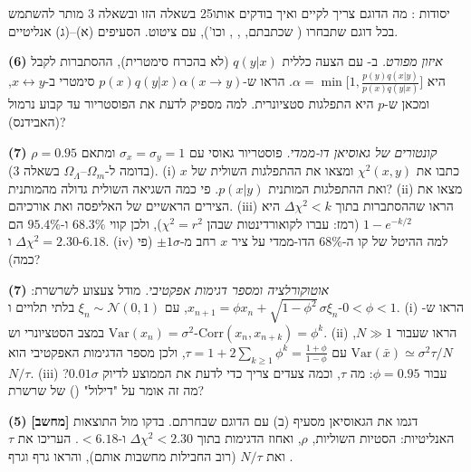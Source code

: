 \documentclass[11pt,a4paper]{article}
\begin{document}
\begin{question}{יסודות : מה הדוגם צריך לקיים ואיך בודקים אותו}{25}
בשאלה הזו ובשאלה 3 מותר להשתמש בכל דוגם שתבחרו ( שכתבתם, , ,  וכו'), עם ציטוט. הסעיפים (א)--(ג) אנליטיים.
\begin{parts}
\item \textbf{(6)} \emph{איזון מפורט.} ב- עם הצעה כללית $q(y|x)$ (לא בהכרח סימטרית), ההסתברות לקבל היא $\alpha=\min\!\big[1,\frac{p(y)q(x|y)}{p(x)q(y|x)}\big]$. הראו ש-$p(x)q(y|x)\alpha(x\to y)$ סימטרי ב-$x\leftrightarrow y$, ומכאן ש-$p$ היא התפלגות סטציונרית. למה מספיק לדעת את הפוסטריור עד קבוע נרמול (האבידנס)?
\item \textbf{(7)} \emph{קונטורים של גאוסיאן דו-ממדי.} פוסטריור גאוסי עם $\sigma_x=\sigma_y=1$ ומתאם $\rho=0.95$ (בדומה ל-$\Omega_m$--$\Omega_\Lambda$ בשאלה 3). (i) כתבו את $\chi^2(x,y)$ ומצאו את ההתפלגות השולית של $x$ ואת ההתפלגות המותנית $p(x|y)$. פי כמה השגיאה השולית גדולה מהמותנית? (ii) מצאו את הצירים הראשיים של האליפסה ואת אורכיהם. (iii) הראו שההסתברות בתוך $\Delta\chi^2<k$ היא $1-e^{-k/2}$ (רמז: עברו לקואורדינטות שבהן $\chi^2=r^2$), ולכן קווי $68.3\%$ ו-$95.4\%$ הם $\Delta\chi^2=2.30$ ו-$6.18$. (iv) למה ההיטל של קו ה-$68\%$ הדו-ממדי על ציר $x$ רחב מ-$\pm1\sigma$ (פי כמה)?
\item \textbf{(7)} \emph{אוטוקורלציה ומספר דגימות אפקטיבי.} מודל צעצוע לשרשרת: $x_{n+1}=\phi x_n+\sqrt{1-\phi^2}\,\sigma\xi_n$, עם $\xi_n\sim\mathcal N(0,1)$ בלתי תלויים ו-$0<\phi<1$. (i) הראו ש-$\mathrm{Var}(x_n)=\sigma^2$ במצב הסטציונרי וש-$\mathrm{Corr}(x_n,x_{n+k})=\phi^k$. (ii) הראו שעבור $N\gg1$, $\mathrm{Var}(\bar x)\simeq\sigma^2\tau/N$ עם $\tau=1+2\sum_{k\ge1}\phi^k=\frac{1+\phi}{1-\phi}$, ולכן מספר הדגימות האפקטיבי הוא $N/\tau$. (iii) עבור $\phi=0.95$: מה $\tau$, וכמה צעדים צריך כדי לדעת את הממוצע לדיוק $0.01\sigma$? מה זה אומר על "דילול" () של שרשרת?
\item \textbf{(5)} \textbf{[מחשב]} דגמו את הגאוסיאן מסעיף (ב) עם הדוגם שבחרתם. בדקו מול התוצאות האנליטיות: הסטיות השוליות, $\rho$, ואחוז הדגימות בתוך $\Delta\chi^2<2.30$ ו-$<6.18$. העריכו את $\tau$ ואת $N/\tau$ (רוב החבילות מחשבות אותם), והראו גרף  וגרף .
\end{parts}
\end{question}
\end{document}
